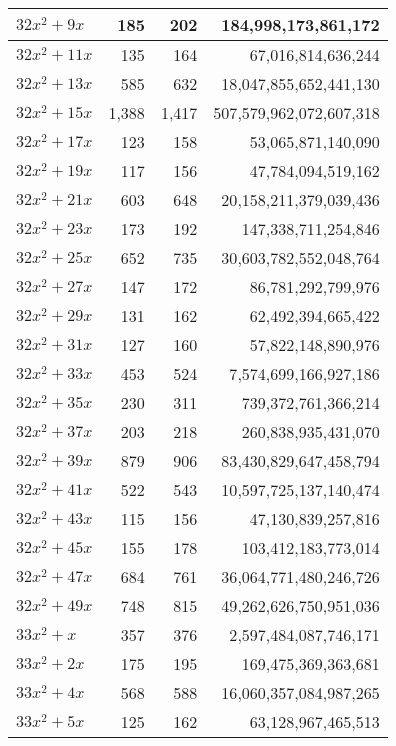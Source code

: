 \documentclass[a4paper]{amsproc}
\theoremstyle{plain}
\begin{document}
\begin{longtable}{ | l | r | r | r | }
$32x^2 + 9x$ & 185 & 202 & 184{,}998{,}173{,}861{,}172 \\ \hline
$32x^2 + 11x$ & 135 & 164 & 67{,}016{,}814{,}636{,}244 \\ \hline
$32x^2 + 13x$ & 585 & 632 & 18{,}047{,}855{,}652{,}441{,}130 \\ \hline
$32x^2 + 15x$ & 1{,}388 & 1{,}417 & 507{,}579{,}962{,}072{,}607{,}318 \\ \hline
$32x^2 + 17x$ & 123 & 158 & 53{,}065{,}871{,}140{,}090 \\ \hline
$32x^2 + 19x$ & 117 & 156 & 47{,}784{,}094{,}519{,}162 \\ \hline
$32x^2 + 21x$ & 603 & 648 & 20{,}158{,}211{,}379{,}039{,}436 \\ \hline
$32x^2 + 23x$ & 173 & 192 & 147{,}338{,}711{,}254{,}846 \\ \hline
$32x^2 + 25x$ & 652 & 735 & 30{,}603{,}782{,}552{,}048{,}764 \\ \hline
$32x^2 + 27x$ & 147 & 172 & 86{,}781{,}292{,}799{,}976 \\ \hline
$32x^2 + 29x$ & 131 & 162 & 62{,}492{,}394{,}665{,}422 \\ \hline
$32x^2 + 31x$ & 127 & 160 & 57{,}822{,}148{,}890{,}976 \\ \hline
$32x^2 + 33x$ & 453 & 524 & 7{,}574{,}699{,}166{,}927{,}186 \\ \hline
$32x^2 + 35x$ & 230 & 311 & 739{,}372{,}761{,}366{,}214 \\ \hline
$32x^2 + 37x$ & 203 & 218 & 260{,}838{,}935{,}431{,}070 \\ \hline
$32x^2 + 39x$ & 879 & 906 & 83{,}430{,}829{,}647{,}458{,}794 \\ \hline
$32x^2 + 41x$ & 522 & 543 & 10{,}597{,}725{,}137{,}140{,}474 \\ \hline
$32x^2 + 43x$ & 115 & 156 & 47{,}130{,}839{,}257{,}816 \\ \hline
$32x^2 + 45x$ & 155 & 178 & 103{,}412{,}183{,}773{,}014 \\ \hline
$32x^2 + 47x$ & 684 & 761 & 36{,}064{,}771{,}480{,}246{,}726 \\ \hline
$32x^2 + 49x$ & 748 & 815 & 49{,}262{,}626{,}750{,}951{,}036 \\ \hline
$33x^2 + x$ & 357 & 376 & 2{,}597{,}484{,}087{,}746{,}171 \\ \hline
$33x^2 + 2x$ & 175 & 195 & 169{,}475{,}369{,}363{,}681 \\ \hline
$33x^2 + 4x$ & 568 & 588 & 16{,}060{,}357{,}084{,}987{,}265 \\ \hline
$33x^2 + 5x$ & 125 & 162 & 63{,}128{,}967{,}465{,}513 \\ \hline

\end{longtable}
\end{document}

